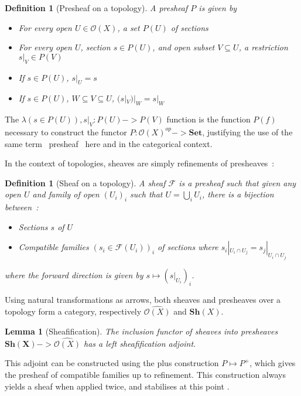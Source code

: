 \documentclass[11pt]{article}
\newtheorem{lemma}[theorem]{Lemma}
\newtheorem{definition}[theorem]{Definition}
\newcommand{\0}{\mathbf{0}}
\newcommand{\1}{\mathbf{1}}
\begin{document}
\begin{definition}[Presheaf on a topology]
    A \emph{presheaf} $P$ is given by
    \begin{itemize}
        \item For every open $U \in \mathcal{O}(X)$, a set $P(U)$ of \emph{sections}
        \item For every open $U$, section $s\in P(U)$, and open subset $V\subseteq U$, a \emph{restriction} $s|_V\in P(V)$
        \item If $s\in P(U)$, $s|_U = s$
        \item If $s\in P(U)$, $W\subseteq V \subseteq U$, $(s|_V)|_W = s|_W$
    \end{itemize}
\end{definition}
The $\lambda (s\in P(U)), s|_V : P(U) -> P(V)$ function is the function $P(f)$ necessary to construct the functor $P : \mathcal{O}(X)^{op} -> \mathbf{Set}$, justifying the use of the same term \guillemotleft~presheaf \guillemotright\ here and in the categorical context.

In the context of topologies, sheaves are simply refinements of presheaves~:
\begin{definition}[Sheaf on a topology]
    A \emph{sheaf} $\mathcal{F}$ is a presheaf such that given any open  $U$ and family of open $(U_i)_i$ such that $U = \bigcup_i U_i$, there is a bijection between~:
    \begin{itemize}
        \item Sections $s$ of $U$
        \item \emph{Compatible} families $(s_i\in \mathcal{F}(U_i))_i$ of sections where $s_i|_{U_i\cap U_j} = s_j|_{U_i\cap U_j}$
    \end{itemize}
    where the forward direction is given by $s \mapsto (s|_{U_i})_i$.
\end{definition}

Using natural transformations as arrows, both sheaves and presheaves over a topology form a category, respectively $\widehat{\mathcal{O}(X)}$ and $\mathbf{Sh}(X)$.
\begin{lemma}[Sheafification]
    The inclusion functor of sheaves into presheaves $\mathbf{Sh(X)} -> \widehat{\mathcal{O}(X)}$ has a left \emph{sheafification} adjoint.
\end{lemma}

This adjoint can be constructed using the plus construction $P \mapsto P^{+}$, which gives the presheaf of compatible families up to refinement.
This construction always yields a sheaf when applied twice, and stabilises at this point \cite{maclane2012sheaves}.
\end{document}
